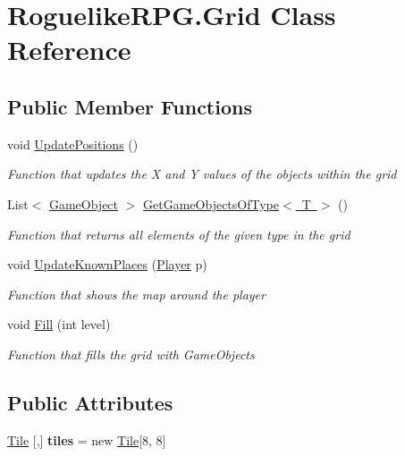 \hypertarget{class_roguelike_r_p_g_1_1_grid}{}\section{Roguelike\+R\+P\+G.\+Grid Class Reference}
\label{class_roguelike_r_p_g_1_1_grid}


 


\subsection*{Public Member Functions}
\begin{DoxyCompactItemize}
\item 
void \mbox{\hyperlink{class_roguelike_r_p_g_1_1_grid_a91be273f5c588230875e727f69956db9}{Update\+Positions}} ()
\begin{DoxyCompactList}\small\item\em Function that updates the X and Y values of the objects within the grid \end{DoxyCompactList}\item 
List$<$ \mbox{\hyperlink{class_roguelike_r_p_g_1_1_game_object}{Game\+Object}} $>$ \mbox{\hyperlink{class_roguelike_r_p_g_1_1_grid_aa1811392b11d7f50de49a599128832fe}{Get\+Game\+Objects\+Of\+Type$<$ T $>$}} ()
\begin{DoxyCompactList}\small\item\em Function that returns all elements of the given type in the grid \end{DoxyCompactList}\item 
void \mbox{\hyperlink{class_roguelike_r_p_g_1_1_grid_a025f9368d08af8faf4d3e25765f60aaa}{Update\+Known\+Places}} (\mbox{\hyperlink{class_roguelike_r_p_g_1_1_player}{Player}} p)
\begin{DoxyCompactList}\small\item\em Function that shows the map around the player \end{DoxyCompactList}\item 
void \mbox{\hyperlink{class_roguelike_r_p_g_1_1_grid_a9997a333c0f023d83b56ca14bd592deb}{Fill}} (int level)
\begin{DoxyCompactList}\small\item\em Function that fills the grid with Game\+Objects \end{DoxyCompactList}\end{DoxyCompactItemize}
\subsection*{Public Attributes}
\begin{DoxyCompactItemize}
\item 
\mbox{\label{class_roguelike_r_p_g_1_1_grid_ae8f1fe9e449ba7110a910631969c4371}} 
\mbox{\hyperlink{class_roguelike_r_p_g_1_1_tile}{Tile}} \mbox{[},\mbox{]} {\bfseries tiles} = new \mbox{\hyperlink{class_roguelike_r_p_g_1_1_tile}{Tile}}\mbox{[}8, 8\mbox{]}
\end{DoxyCompactItemize}
